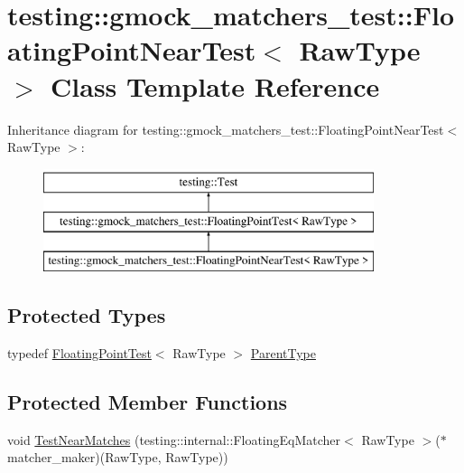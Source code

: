 \hypertarget{classtesting_1_1gmock__matchers__test_1_1FloatingPointNearTest}{}\section{testing\+::gmock\+\_\+matchers\+\_\+test\+::Floating\+Point\+Near\+Test$<$ Raw\+Type $>$ Class Template Reference}
\label{classtesting_1_1gmock__matchers__test_1_1FloatingPointNearTest}
Inheritance diagram for testing\+::gmock\+\_\+matchers\+\_\+test\+::Floating\+Point\+Near\+Test$<$ Raw\+Type $>$\+:\begin{figure}[H]
\begin{center}
\leavevmode
\includegraphics[height=3.000000cm]{classtesting_1_1gmock__matchers__test_1_1FloatingPointNearTest}
\end{center}
\end{figure}
\subsection*{Protected Types}
\begin{DoxyCompactItemize}
\item 
typedef \mbox{\hyperlink{classtesting_1_1gmock__matchers__test_1_1FloatingPointTest}{Floating\+Point\+Test}}$<$ Raw\+Type $>$ \mbox{\hyperlink{classtesting_1_1gmock__matchers__test_1_1FloatingPointNearTest_ac767d2bf3e518d1e7cf9dfafc76cc53a}{Parent\+Type}}
\end{DoxyCompactItemize}
\subsection*{Protected Member Functions}
\begin{DoxyCompactItemize}
\item 
void \mbox{\hyperlink{classtesting_1_1gmock__matchers__test_1_1FloatingPointNearTest_a712b564197ab76f58d345c5e3e73955d}{Test\+Near\+Matches}} (testing\+::internal\+::\+Floating\+Eq\+Matcher$<$ Raw\+Type $>$($\ast$matcher\+\_\+maker)(Raw\+Type, Raw\+Type))
\end{DoxyCompactItemize}

